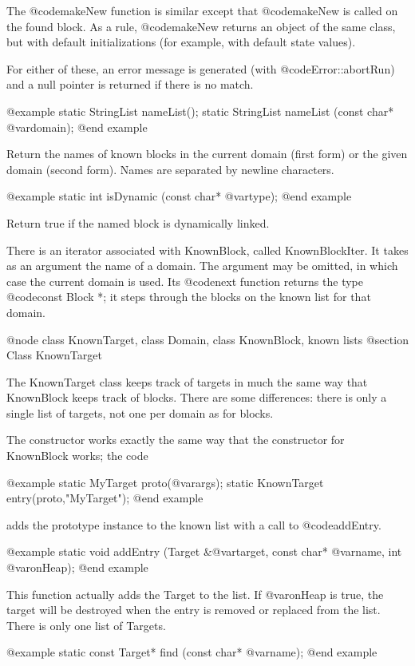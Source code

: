 The @code{makeNew} function is similar except that @code{makeNew}
is called on the found block.  As a rule, @code{makeNew} returns
an object of the same class, but with default initializations
(for example, with default state values).

For either of these, an error message is generated (with
@code{Error::abortRun}) and a null pointer is returned if there is no
match.

@example
static StringList nameList();
static StringList nameList (const char* @var{domain});
@end example

Return the names of known blocks in the current domain (first form) or
the given domain (second form).  Names are
separated by newline characters.

@example
static int isDynamic (const char* @var{type});
@end example

Return true if the named block is dynamically linked.

There is an iterator associated with KnownBlock, called
KnownBlockIter.  It takes as an argument the name of a domain.  The
argument may be omitted, in which case the current domain is used.
Its @code{next} function returns the type @code{const Block *}; it
steps through the blocks on the known list for that domain.

@node class KnownTarget, class Domain, class KnownBlock, known lists
@section Class KnownTarget

The KnownTarget class keeps track of targets in much the same way
that KnownBlock keeps track of blocks.  There are some differences:
there is only a single list of targets, not one per domain as for
blocks.

The constructor works exactly the same way that the constructor for
KnownBlock works; the code

@example
static MyTarget proto(@var{args});
static KnownTarget entry(proto,"MyTarget");
@end example

adds the prototype instance to the known list with a call to
@code{addEntry}.

@example
static void addEntry (Target &@var{target}, const char* @var{name}, int @var{onHeap});
@end example

This function actually adds the Target to the list.  If @var{onHeap} is true,
the target will be destroyed when the entry is removed or replaced from
the list.  There is only one list of Targets.

@example
static const Target* find (const char* @var{name});
@end example

